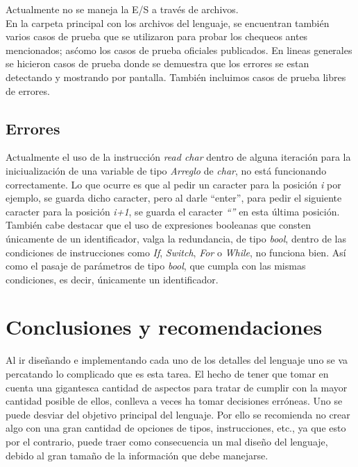 \documentclass[11pt, spanish]{report}
\begin{document}
Actualmente no se maneja la E/S a trav\'es de archivos.\\

En la carpeta principal con los archivos del lenguaje, se encuentran tambi\'en varios casos de prueba que se utilizaron para probar los chequeos antes mencionados; as\' 
como los casos de prueba oficiales publicados. En lineas generales se hicieron casos de prueba donde se demuestra que los errores se estan detectando y mostrando por 
pantalla. Tambi\'en incluimos casos de prueba libres de errores.\\

\section{Errores}

Actualmente el uso de la instrucci\'on \emph{read char} dentro de alguna iteraci\'on para la iniciualizaci\'on de una variable de tipo \emph{Arreglo} de \emph{char}, no est\'a
funcionando correctamente. Lo que ocurre es que al pedir un caracter para la posici\'on \emph{i} por ejemplo, se guarda dicho caracter, pero al darle ``enter'', para
pedir el siguiente caracter para la posici\'on \emph{i+1}, se guarda el caracter \emph{``\n''} en esta \'ultima posici\'on.\\

Tambi\'en cabe destacar que el uso de expresiones booleanas que consten \'unicamente de un identificador, valga la redundancia, de tipo \emph{bool}, dentro de 
las condiciones de instrucciones como \emph{If}, \emph{Switch}, \emph{For} o \emph{While}, no funciona bien. As\'i como el pasaje de par\'ametros de tipo \emph{bool}, 
que cumpla con las mismas condiciones, es decir, \'unicamente un identificador.

\chapter{Conclusiones y recomendaciones}
Al ir dise\~nando e implementando cada uno de los detalles del lenguaje uno se va percatando lo complicado que es esta tarea. El hecho de tener que 
tomar en cuenta una gigantesca cantidad de aspectos para tratar de cumplir con la mayor cantidad posible de ellos, conlleva a veces ha  tomar decisiones err\'oneas. 
Uno se  puede desviar del objetivo principal del lenguaje. Por ello se recomienda no crear algo con una gran cantidad de opciones de tipos, instrucciones, etc., ya 
que esto por el contrario, puede traer como consecuencia un mal dise\~no del lenguaje, debido al gran tama\~no de la informaci\'on que debe manejarse.\\
\end{document}
